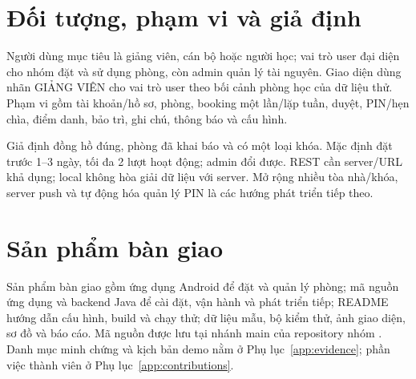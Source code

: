 \section{Đối tượng, phạm vi và giả định}
Người dùng mục tiêu là giảng viên, cán bộ hoặc người học; vai trò user đại diện cho nhóm đặt và sử dụng phòng, còn admin quản lý tài nguyên. Giao diện dùng nhãn GIẢNG VIÊN cho vai trò user theo bối cảnh phòng học của dữ liệu thử. Phạm vi gồm tài khoản/hồ sơ, phòng, booking một lần/lặp tuần, duyệt, PIN/hẹn chìa, điểm danh, bảo trì, ghi chú, thông báo và cấu hình.

Giả định đồng hồ đúng, phòng đã khai báo và có một loại khóa. Mặc định đặt trước 1--3 ngày, tối đa 2 lượt hoạt động; admin đổi được. REST cần server/URL khả dụng; local không hòa giải dữ liệu với server. Mở rộng nhiều tòa nhà/khóa, server push và tự động hóa quản lý PIN là các hướng phát triển tiếp theo.

\section{Sản phẩm bàn giao}
Sản phẩm bàn giao gồm ứng dụng Android để đặt và quản lý phòng; mã nguồn ứng dụng và backend Java để cài đặt, vận hành và phát triển tiếp; README hướng dẫn cấu hình, build và chạy thử; dữ liệu mẫu, bộ kiểm thử, ảnh giao diện, sơ đồ và báo cáo. Mã nguồn được lưu tại nhánh main của repository nhóm \cite{roomhubrepo}. Danh mục minh chứng và kịch bản demo nằm ở Phụ lục~\ref{app:evidence}; phần việc thành viên ở Phụ lục~\ref{app:contributions}.
